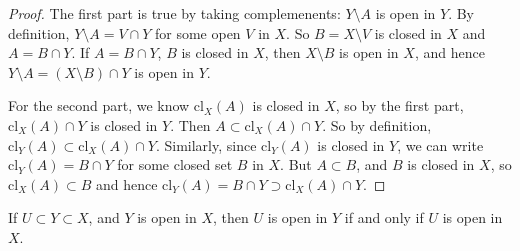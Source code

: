 \begin{proof}
	The first part is true by taking complemenents: \( Y \setminus A \) is open in \( Y \).
	By definition, \( Y \setminus A = V \cap Y \) for some open \( V \) in \( X \).
	So \( B = X \setminus V \) is closed in \( X \) and \( A = B \cap Y \).
	If \( A = B \cap Y \), \( B \) is closed in \( X \), then \( X \setminus B \) is open in \( X \), and hence \( Y \setminus A = (X \setminus B) \cap Y \) is open in \( Y \).

	For the second part, we know \( \mathrm{cl}_X(A) \) is closed in \( X \), so by the first part, \( \mathrm{cl}_X(A) \cap Y \) is closed in \( Y \).
	Then \( A \subset \mathrm{cl}_X(A) \cap Y \).
	So by definition, \( \mathrm{cl}_Y(A) \subset \mathrm{cl}_X(A) \cap Y \).
	Similarly, since \( \mathrm{cl}_Y(A) \) is closed in \( Y \), we can write \( \mathrm{cl}_Y(A) = B \cap Y \) for some closed set \( B \) in \( X \).
	But \( A \subset B \), and \( B \) is closed in \( X \), so \( \mathrm{cl}_X(A) \subset B \) and hence \( \mathrm{cl}_Y(A) = B \cap Y \supset \mathrm{cl}_X(A) \cap Y \).
\end{proof}
\begin{remark}
	If \( U \subset Y \subset X \), and \( Y \) is open in \( X \), then \( U \) is open in \( Y \) if and only if \( U \) is open in \( X \).
\end{remark}

